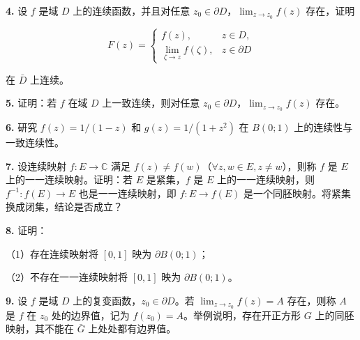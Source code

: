 \documentclass[11pt,a4paper]{article}
\begin{document}
\par{}
\noindent\textbf{4.} 设 \(f\) 是域 \(D\) 上的连续函数，并且对任意
\(z_0\in\partial D\)，\(\lim_{z\to z_0}f(z)\) 存在，证明

\[
F(z)=\begin{cases}
f(z),&z\in D,\\
\displaystyle\lim_{\zeta\to z}f(\zeta),&z\in\partial D
\end{cases}
\]

在 \(\bar D\) 上连续。

\par{}
\noindent\textbf{5.} 证明：若 \(f\) 在域 \(D\) 上一致连续，则对任意
\(z_0\in\partial D\)，\(\lim_{z\to z_0}f(z)\) 存在。

\par{}
\noindent\textbf{6.} 研究 \(f(z)=1/(1-z)\) 和 \(g(z)=1/(1+z^2)\) 在 \(B(0;1)\)
上的连续性与一致连续性。

\par{}
\noindent\textbf{7.} 设连续映射 \(f:E\to\mathbb C\) 满足
\(f(z)\ne f(w)\)（\(\forall z,w\in E,z\ne w\)），则称 \(f\) 是 \(E\)
上的一一连续映射。证明：若 \(E\) 是紧集，\(f\) 是 \(E\)
上的一一连续映射，则 \(f^{-1}:f(E)\to E\) 也是一一连续映射，即
\(f:E\to f(E)\) 是一个同胚映射。将紧集换成闭集，结论是否成立？

\par{}
\noindent\textbf{8.} 证明：

（1）存在连续映射将 \([0,1]\) 映为 \(\partial B(0;1)\)；

（2）不存在一一连续映射将 \([0,1]\) 映为 \(\partial B(0;1)\)。

\par{}
\noindent\textbf{9.} 设 \(f\) 是域 \(D\) 上的复变函数，\(z_0\in\partial D\)。若
\(\lim_{z\to z_0}f(z)=A\) 存在，则称 \(A\) 是 \(f\) 在 \(z_0\)
处的边界值，记为 \(f(z_0)=A\)。举例说明，存在开正方形 \(G\)
上的同胚映射，其不能在 \(\bar G\) 上处处都有边界值。
\end{document}
